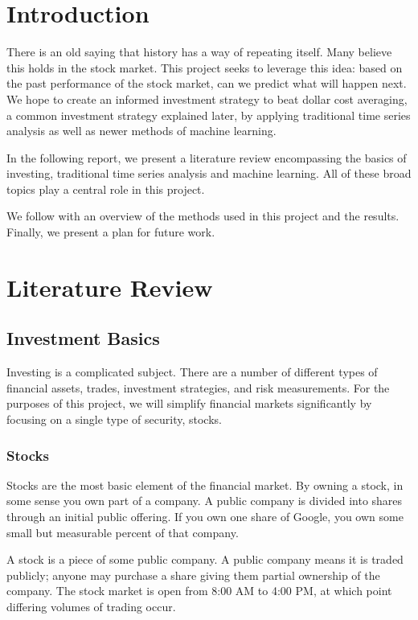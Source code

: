 \documentclass[12pt]{article}
\begin{document}
\section{Introduction}
There is an old saying that history has a way of repeating itself. Many believe this holds in the stock market. This project seeks to leverage this idea: based on the past performance of the stock market, can we predict what will happen next. We hope to create an informed investment strategy to beat dollar cost averaging, a common investment strategy explained later, by applying traditional time series analysis as well as newer methods of machine learning.

In the following report, we present a literature review encompassing the basics of investing, traditional time series analysis and machine learning. All of these broad topics play a central role in this project. 

We follow with an overview of the methods used in this project and the results. Finally, we present a plan for future work.

\section{Literature Review}
\subsection{Investment Basics}
Investing is a complicated subject. There are a number of different types of financial assets, trades, investment strategies, and risk measurements. For the purposes of this project, we will simplify financial markets significantly by focusing on a single type of security, stocks. 

\subsubsection{Stocks}
Stocks are the most basic element of the financial market. By owning a stock, in some sense you own part of a company. A public company is divided into shares through an initial public offering. If you own one share of Google, you own some small but measurable percent of that company.

A stock is a piece of some public company. A public company means it is traded publicly; anyone may purchase a share giving them partial ownership of the company. The stock market is open from 8:00 AM to 4:00 PM, at which point differing volumes of trading occur. 
\end{document}

